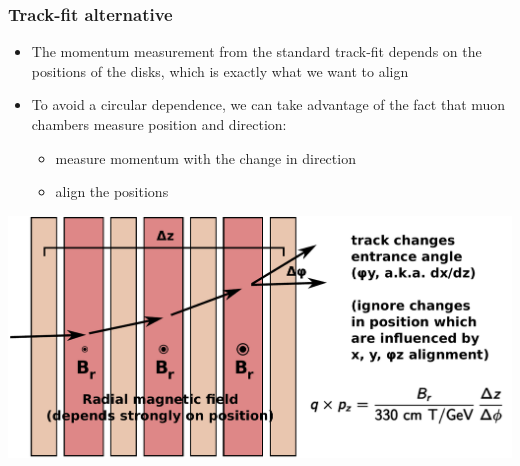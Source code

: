 \documentclass[compress]{beamer}
\begin{document}
\begin{frame}
\frametitle{Track-fit alternative}

\begin{itemize}
\item The momentum measurement from the standard track-fit depends
  on the positions of the disks, which is exactly what we want to
  align
\item To avoid a circular dependence, we can take advantage of the
  fact that muon chambers measure position and direction:
\begin{itemize}
\item measure momentum with the change in direction
\item align the positions
\end{itemize}
\end{itemize}
\begin{center}
\includegraphics[width=0.85\linewidth]{pzfit.pdf}
\end{center}
\end{frame}
\end{document}
